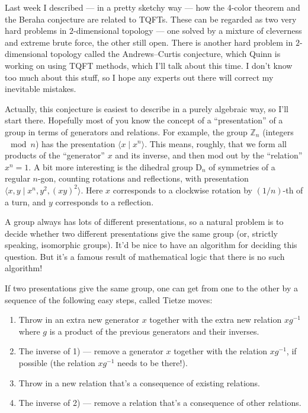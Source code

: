 \documentclass[12pt]{article}
\def\tightlist{}
\begin{document}
Last week I described --- in a pretty sketchy way --- how the 4-color
theorem and the Beraha conjecture are related to TQFTs. These can be
regarded as two very hard problems in \(2\)-dimensional topology --- one
solved by a mixture of cleverness and extreme brute force, the other
still open. There is another hard problem in \(2\)-dimensional topology
called the Andrews--Curtis conjecture, which Quinn is working on using
TQFT methods, which I'll talk about this time. I don't know too much
about this stuff, so I hope any experts out there will correct my
inevitable mistakes.

Actually, this conjecture is easiest to describe in a purely algebraic
way, so I'll start there. Hopefully most of you know the concept of a
``presentation'' of a group in terms of generators and relations. For
example, the group \(\mathbb{Z}_n\) (integers \(\mod n\)) has the
presentation \(\langle x \mid x^n\rangle\). This means, roughly, that we
form all products of the ``generator'' \(x\) and its inverse, and then
mod out by the ``relation'' \(x^n = 1\). A bit more interesting is the
dihedral group \(\mathrm{D}_n\) of symmetries of a regular \(n\)-gon,
counting rotations and reflections, with presentation
\(\langle x,y \mid x^n, y^2, (xy)^2 \rangle\). Here \(x\) corresponds to
a clockwise rotation by \((1/n)\)-th of a turn, and \(y\) corresponds to
a reflection.

A group always has lots of different presentations, so a natural problem
is to decide whether two different presentations give the same group
(or, strictly speaking, isomorphic groups). It'd be nice to have an
algorithm for deciding this question. But it's a famous result of
mathematical logic that there is no such algorithm!

If two presentations give the same group, one can get from one to the
other by a sequence of the following easy steps, called Tietze moves:

\begin{enumerate}
\def\labelenumi{\arabic{enumi})}
\tightlist
\item
  Throw in an extra new generator \(x\) together with the extra new
  relation \(xg^{-1}\) where \(g\) is a product of the previous
  generators and their inverses.
\item
  The inverse of 1) --- remove a generator \(x\) together with the
  relation \(xg^{-1}\), if possible (the relation \(xg^{-1}\) needs to
  be there!).
\item
  Throw in a new relation that's a consequence of existing relations.
\item
  The inverse of 2) --- remove a relation that's a consequence of other
  relations.
\end{enumerate}
\end{document}
